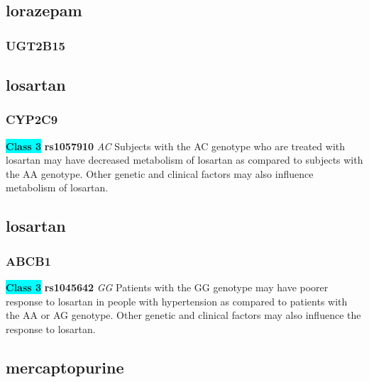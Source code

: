 \documentclass{book}
\begin{document}
\begin{center}



\end{center}\subsection{ lorazepam }


\subsubsection{ UGT2B15 }

\begin{center}



\end{center}\subsection{ losartan }


\subsubsection{ CYP2C9 }

\begin{center}
\textbf{\colorbox{cyan} {Class 3}} \textbf{ rs1057910 } \textit{ AC }
Subjects with the AC genotype who are treated with losartan may have decreased metabolism of losartan as compared to subjects with the AA genotype. Other genetic and clinical factors may also influence metabolism of losartan.


\end{center}\subsection{ losartan }


\subsubsection{ ABCB1 }

\begin{center}
\textbf{\colorbox{cyan} {Class 3}} \textbf{ rs1045642 } \textit{ GG }
Patients with the GG genotype may have poorer response to losartan in people with hypertension as compared to patients with the AA or AG genotype. Other genetic and clinical factors may also influence the response to losartan.


\end{center}\subsection{ mercaptopurine }
\end{document}
